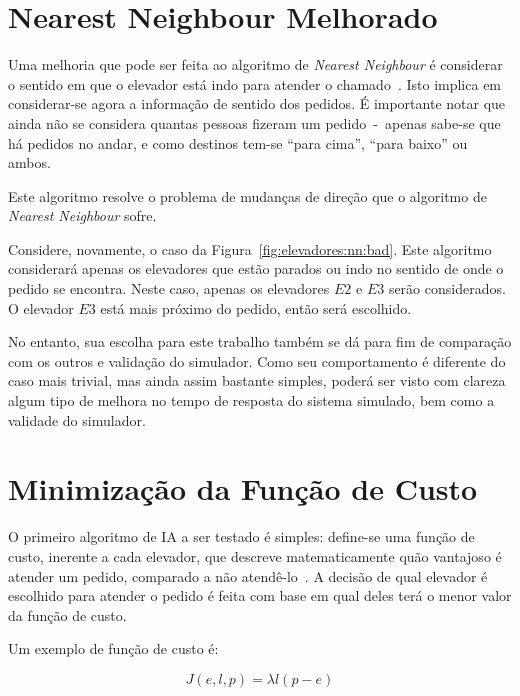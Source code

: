 \section{\label{sec:ai:nnm}Nearest Neighbour Melhorado}

Uma melhoria que pode ser feita ao algoritmo de \textit{Nearest Neighbour}
é considerar o sentido em que o elevador está indo para atender o
chamado~\cite{Friese20061908}. Isto implica em considerar-se agora
a informação de sentido dos pedidos. É importante notar que ainda não se
considera quantas pessoas fizeram um pedido~-~apenas sabe-se que há pedidos no
andar, e como destinos tem-se ``para cima'', ``para baixo'' ou ambos.

Este algoritmo resolve o problema de mudanças de direção que o algoritmo de
\textit{Nearest Neighbour} sofre.

Considere, novamente, o caso da Figura~\ref{fig:elevadores:nn:bad}. Este
algoritmo considerará apenas os elevadores que estão parados ou indo no sentido
de onde o pedido se encontra. Neste caso, apenas os elevadores $E2$ e $E3$ serão
considerados. O elevador $E3$ está mais próximo do pedido, então será escolhido.

No entanto, sua escolha para este trabalho também se dá para fim de comparação
com os outros e validação do simulador. Como seu comportamento é diferente do
caso mais trivial, mas ainda assim bastante simples, poderá ser visto com clareza
algum tipo de melhora no tempo de resposta do sistema simulado, bem como a validade do simulador.

\section{\label{sec:ai:minimize-cost-function}Minimização da Função de Custo}

O primeiro algoritmo de IA a ser testado é simples: define-se uma
função de custo, inerente a cada elevador, que descreve matematicamente quão
vantajoso é atender um pedido, comparado a não atendê-lo~\cite{Friese20061908}.
A decisão de qual elevador é escolhido para atender o pedido é feita com base
em qual deles terá o menor valor da função de custo.

Um exemplo de função de custo é:

\[
  J(e, l, p) = \lambda l(p - e)
\]

